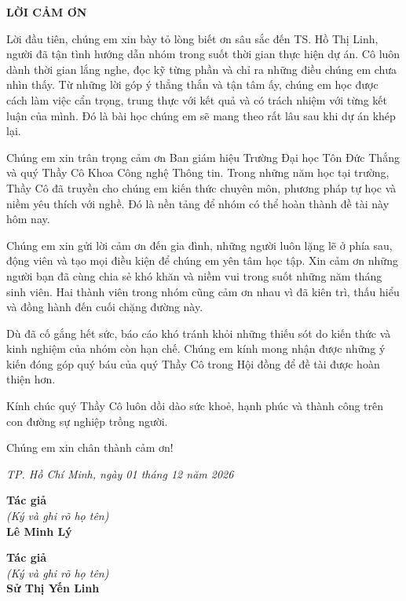 \newpage
\begin{center}
{\fontsize{16pt}{19.2pt}\selectfont \textbf{LỜI CẢM ƠN}\par}
\end{center}
\vspace{0.5cm}

Lời đầu tiên, chúng em xin bày tỏ lòng biết ơn sâu sắc đến TS. Hồ Thị Linh, người đã tận tình hướng dẫn nhóm trong suốt thời gian thực hiện dự án. Cô luôn dành thời gian lắng nghe, đọc kỹ từng phần và chỉ ra những điều chúng em chưa nhìn thấy. Từ những lời góp ý thẳng thắn và tận tâm ấy, chúng em học được cách làm việc cẩn trọng, trung thực với kết quả và có trách nhiệm với từng kết luận của mình. Đó là bài học chúng em sẽ mang theo rất lâu sau khi dự án khép lại.

Chúng em xin trân trọng cảm ơn Ban giám hiệu Trường Đại học Tôn Đức Thắng và quý Thầy Cô Khoa Công nghệ Thông tin. Trong những năm học tại trường, Thầy Cô đã truyền cho chúng em kiến thức chuyên môn, phương pháp tự học và niềm yêu thích với nghề. Đó là nền tảng để nhóm có thể hoàn thành đề tài này hôm nay.

Chúng em xin gửi lời cảm ơn đến gia đình, những người luôn lặng lẽ ở phía sau, động viên và tạo mọi điều kiện để chúng em yên tâm học tập. Xin cảm ơn những người bạn đã cùng chia sẻ khó khăn và niềm vui trong suốt những năm tháng sinh viên. Hai thành viên trong nhóm cũng cảm ơn nhau vì đã kiên trì, thấu hiểu và đồng hành đến cuối chặng đường này.

Dù đã cố gắng hết sức, báo cáo khó tránh khỏi những thiếu sót do kiến thức và kinh nghiệm của nhóm còn hạn chế. Chúng em kính mong nhận được những ý kiến đóng góp quý báu của quý Thầy Cô trong Hội đồng để đề tài được hoàn thiện hơn.

Kính chúc quý Thầy Cô luôn dồi dào sức khoẻ, hạnh phúc và thành công trên con đường sự nghiệp trồng người.

Chúng em xin chân thành cảm ơn!

\vspace{0.8cm}

\begin{flushright}
\textit{TP. Hồ Chí Minh, ngày 01 tháng 12 năm 2026}
\end{flushright}

\vspace{0.3cm}
\noindent
\begin{minipage}[t]{0.48\textwidth}
    \centering
    \textbf{Tác giả} \\
    \textit{(Ký và ghi rõ họ tên)} \\
    \vspace{2.5cm}
    \textbf{Lê Minh Lý}
\end{minipage}
\hfill
\begin{minipage}[t]{0.48\textwidth}
    \centering
    \textbf{Tác giả} \\
    \textit{(Ký và ghi rõ họ tên)} \\
    \vspace{2.5cm}
    \textbf{Sử Thị Yến Linh}
\end{minipage}